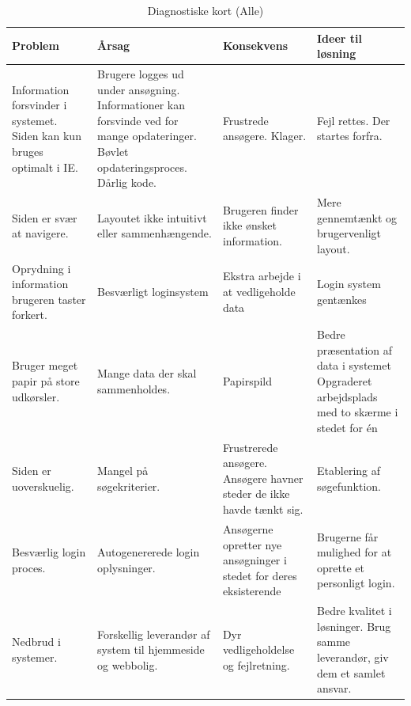 \documentclass[12pt, a4paper]{report}
\begin{document}
\begin{table}[hbt]
\caption{Diagnostiske kort (Alle)}
\label{d_kort}
\begin{tabular}{| p{} | p{} | p{} | p{} |}
\hline
Problem & Årsag & Konsekvens & Ideer til løsning \\ \hline
Information forsvinder i systemet. \newline Siden kan kun bruges optimalt i IE. & Brugere logges ud under ansøgning. \newline Informationer kan forsvinde ved for mange opdateringer. \newline Bøvlet opdateringsproces. \newline Dårlig kode. & Frustrede ansøgere. \newline Klager. & Fejl rettes. \newline Der startes forfra. \\ \hline

Siden er svær at navigere. & Layoutet ikke intuitivt eller sammenhængende. & Brugeren finder ikke ønsket information. & Mere gennemtænkt og brugervenligt layout. \\ \hline

Oprydning i information brugeren taster forkert. & Besværligt loginsystem & Ekstra arbejde i at vedligeholde data & Login system gentænkes \\ \hline

Bruger meget papir på store udkørsler. & Mange data der skal sammenholdes. & Papirspild & Bedre præsentation af data i systemet \newline Opgraderet arbejdsplads med to skærme i stedet for én \\ \hline

Siden er uoverskuelig. & Mangel på søgekriterier. & Frustrerede ansøgere. \newline Ansøgere havner steder de ikke havde tænkt sig. & Etablering af søgefunktion. \\ \hline

Besværlig login proces. & Autogenererede login oplysninger. & Ansøgerne opretter nye ansøgninger i stedet for deres eksisterende & Brugerne får mulighed for at oprette et personligt login. \\ \hline

Nedbrud i systemer. & Forskellig leverandør af system til hjemmeside og webbolig. & Dyr vedligeholdelse og fejlretning. & Bedre kvalitet i løsninger. \newline Brug samme leverandør, giv dem et samlet ansvar. \\ \hline
\end{tabular}
\end{table}
\end{document}
